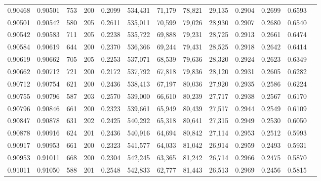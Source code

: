 \begin{tabular}{rrrrrrrrrrrrr}
0.90468 & 0.90501 &   753 & 200 &                                     0.2099 & 534,431 &  71,179 &  78,821 &  29,135 & 0.2904 & 0.2699 & 0.6593 \\
0.90501 & 0.90542 &   580 & 205 &                                     0.2611 & 535,011 &  70,599 &  79,026 &  28,930 & 0.2907 & 0.2680 & 0.6540 \\
0.90542 & 0.90583 &   711 & 205 &                                     0.2238 & 535,722 &  69,888 &  79,231 &  28,725 & 0.2913 & 0.2661 & 0.6474 \\
0.90584 & 0.90619 &   644 & 200 &                                     0.2370 & 536,366 &  69,244 &  79,431 &  28,525 & 0.2918 & 0.2642 & 0.6414 \\
0.90619 & 0.90662 &   705 & 205 &                                     0.2253 & 537,071 &  68,539 &  79,636 &  28,320 & 0.2924 & 0.2623 & 0.6349 \\
0.90662 & 0.90712 &   721 & 200 &                                     0.2172 & 537,792 &  67,818 &  79,836 &  28,120 & 0.2931 & 0.2605 & 0.6282 \\
0.90712 & 0.90754 &   621 & 200 &                                     0.2436 & 538,413 &  67,197 &  80,036 &  27,920 & 0.2935 & 0.2586 & 0.6224 \\
0.90755 & 0.90796 &   587 & 203 &                                     0.2570 & 539,000 &  66,610 &  80,239 &  27,717 & 0.2938 & 0.2567 & 0.6170 \\
0.90796 & 0.90846 &   661 & 200 &                                     0.2323 & 539,661 &  65,949 &  80,439 &  27,517 & 0.2944 & 0.2549 & 0.6109 \\
0.90847 & 0.90878 &   631 & 202 &                                     0.2425 & 540,292 &  65,318 &  80,641 &  27,315 & 0.2949 & 0.2530 & 0.6050 \\
0.90878 & 0.90916 &   624 & 201 &                                     0.2436 & 540,916 &  64,694 &  80,842 &  27,114 & 0.2953 & 0.2512 & 0.5993 \\
0.90917 & 0.90953 &   661 & 200 &                                     0.2323 & 541,577 &  64,033 &  81,042 &  26,914 & 0.2959 & 0.2493 & 0.5931 \\
0.90953 & 0.91011 &   668 & 200 &                                     0.2304 & 542,245 &  63,365 &  81,242 &  26,714 & 0.2966 & 0.2475 & 0.5870 \\
0.91011 & 0.91050 &   588 & 201 &                                     0.2548 & 542,833 &  62,777 &  81,443 &  26,513 & 0.2969 & 0.2456 & 0.5815 \\

\end{tabular}
